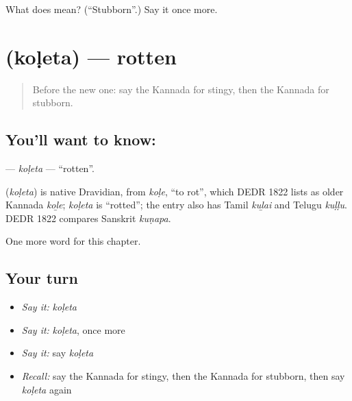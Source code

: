 \begin{tcolorbox}[breakable,colback=teal!4,colframe=teal!35!black,title={Before you move on}]
What does  mean? (\textquotedblleft{}Stubborn\textquotedblright{}.) Say it once more.
\end{tcolorbox}
\section[\texorpdfstring{\kn{ಕೊಳೆತ} (koḷeta)}{ಕೊಳೆತ (koḷeta)}]{ (koḷeta) — rotten}

\label{lesson:KA-C182-koleta}



\begin{quote}
Before the new one: say the Kannada for stingy, then the Kannada for stubborn.
\end{quote}

\subsection*{You'll want to know: }
\textbf{} — \emph{koḷeta} — \textquotedblleft{}rotten\textquotedblright{}.

\begin{cousinweb}
\textbf{} (\emph{koḷeta}) is native Dravidian, from \emph{koḷe}, \textquotedblleft{}to rot\textquotedblright{}, which DEDR 1822 lists as older Kannada \emph{koḻe}; \emph{koḷeta} is \textquotedblleft{}rotted\textquotedblright{}; the entry also has Tamil \emph{kuḻai} and Telugu \emph{kuḷḷu}. DEDR 1822 compares Sanskrit \emph{kuṇapa}.
\end{cousinweb}

\begin{grammarlens}[title={What you've built}]
One more word for this chapter.
\end{grammarlens}

\subsection*{Your turn}
\begin{itemize}
\raggedright
  \item \emph{Say it:} \emph{koḷeta}
  \item \emph{Say it:} \emph{koḷeta}, once more
  \item \emph{Say it:} say \emph{koḷeta}
  \item \emph{Recall:} say the Kannada for stingy, then the Kannada for stubborn, then say \emph{koḷeta} again
\end{itemize}


